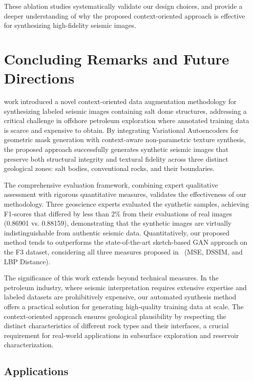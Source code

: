 \documentclass{ieeeaccess}
\begin{document}
These ablation studies systematically validate our design choices, and provide a deeper understanding of why the proposed context-oriented approach is effective for synthesizing high-fidelity seismic images.


\section{Concluding Remarks and Future Directions}
\label{sec:conclusion}

 work introduced a novel context-oriented data augmentation methodology for synthesizing labeled seismic images containing salt dome structures, addressing a critical challenge in offshore petroleum exploration where annotated training data is scarce and expensive to obtain. By integrating Variational Autoencoders for geometric mask generation with context-aware non-parametric texture synthesis, the proposed approach successfully generates synthetic seismic images that preserve both structural integrity and textural fidelity across three distinct geological zones: salt bodies, conventional rocks, and their boundaries.

The comprehensive evaluation framework, combining expert qualitative assessment with rigorous quantitative measures, validates the effectiveness of our methodology. Three geoscience experts evaluated the synthetic samples, achieving F1-scores that differed by less than 2\% from their evaluations of real images (0.86901 vs. 0.88159), demonstrating that the synthetic images are virtually indistinguishable from authentic seismic data. Quantitatively, our proposed method tends to   outperforms the state-of-the-art sketch-based GAN approach on the F3 dataset, considering all three measures proposed in~\cite{Ferreira2020} (MSE, DSSIM, and LBP Distance). %

The significance of this work extends beyond technical measures. In the petroleum industry, where seismic interpretation requires extensive expertise and labeled datasets are prohibitively expensive, our automated synthesis method offers a practical solution for generating high-quality training data at scale. The context-oriented approach ensures geological plausibility by respecting the distinct characteristics of different rock types and their interfaces, a crucial requirement for real-world applications in subsurface exploration and reservoir characterization.

\subsection{Applications}
\end{document}
